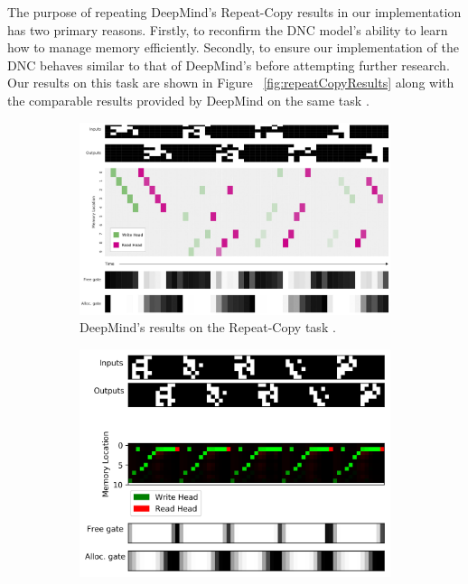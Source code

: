 The purpose of repeating DeepMind's Repeat-Copy results \cite{graves2016hybrid}
in our implementation has two primary reasons. Firstly, to reconfirm the DNC
model's ability to learn how to manage memory efficiently. Secondly, to ensure
our implementation of the DNC behaves similar to that of DeepMind's
before attempting further research. Our results on this task are shown in
Figure ~\ref{fig:repeatCopyResults} along with the comparable results provided
by DeepMind on the same task \cite{graves2016hybrid}.

\begin{figure}[!htb]
\begin{subfigure}{.9\textwidth}
    \centering
    \includegraphics[width=1.0\linewidth]{../resources/DeepMind-RC-results.png}
    \caption{
        DeepMind's results on the Repeat-Copy task \cite{graves2016hybrid}.
    }
    \label{fig:repeatCopyResults_a}
\end{subfigure}
\begin{subfigure}{.9\textwidth}
    \centering
    \includegraphics[width=1.0\linewidth]{../resources/RC-results.png}

\end{subfigure}
\end{figure}

